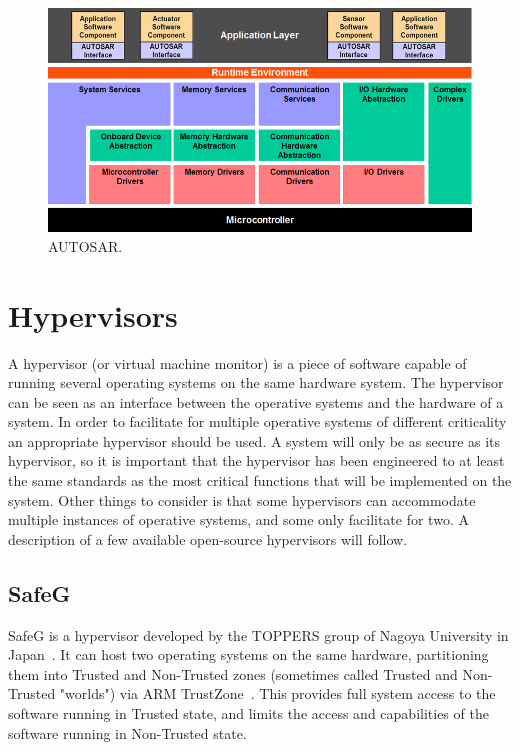 \begin{figure}[H]
\centering
\includegraphics[width=\textwidth]{./img/literature_autosar.png}
\caption{AUTOSAR.~\cite{website:autosar}}\label{fig:autosar}
\end{figure}

\section{Hypervisors}
A hypervisor (or virtual machine monitor) is a piece of software capable of running several operating systems on the same hardware system. The hypervisor can be seen as an interface between the operative systems and the hardware of a system. In order to facilitate for multiple operative systems of different criticality an appropriate hypervisor should be used. A system will only be as secure as its hypervisor, so it is important that the hypervisor has been engineered to at least the same standards as the most critical functions that will be implemented on the system. Other things to consider is that some hypervisors can accommodate multiple instances of operative systems, and some only facilitate for two. A description of a few available open-source hypervisors will follow.

\subsection{SafeG}
\label{sec:safeg}
SafeG is a hypervisor developed by the TOPPERS group of Nagoya University in Japan~\cite{website:safeg}. It can host two operating systems on the same hardware, partitioning them into Trusted and Non-Trusted zones (sometimes called Trusted and Non-Trusted "worlds") via ARM TrustZone~\cite{website:ARM}. This provides full system access to the software running in Trusted state, and limits the access and capabilities of the software running in Non-Trusted state.\\

